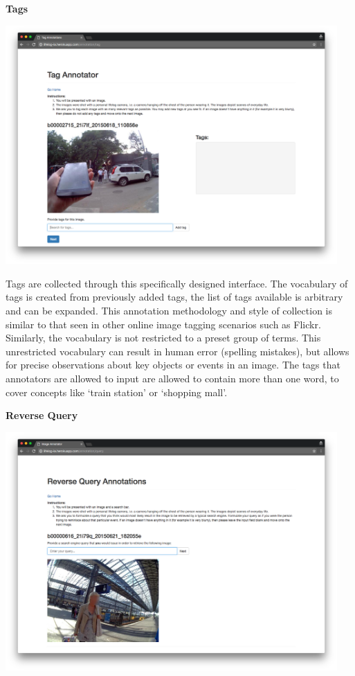 \textbf{Tags}

\includegraphics[width=0.95\textwidth]{images/tag-interface}

Tags are collected through this specifically designed interface. The vocabulary of tags is created from previously added tags, the list of tags available is arbitrary and can be expanded. This annotation methodology and style of collection is similar to that seen in other online image tagging scenarios such as Flickr. Similarly, the vocabulary is not restricted to a preset group of terms. This unrestricted vocabulary can result in human error (spelling mistakes), but allows for precise observations about key objects or events in an image. The tags that annotators are allowed to input are allowed to contain more than one word, to cover concepts like `train station' or `shopping mall'.

\newpage
\textbf{Reverse Query}

\includegraphics[width=0.95\textwidth]{images/query-interface}


